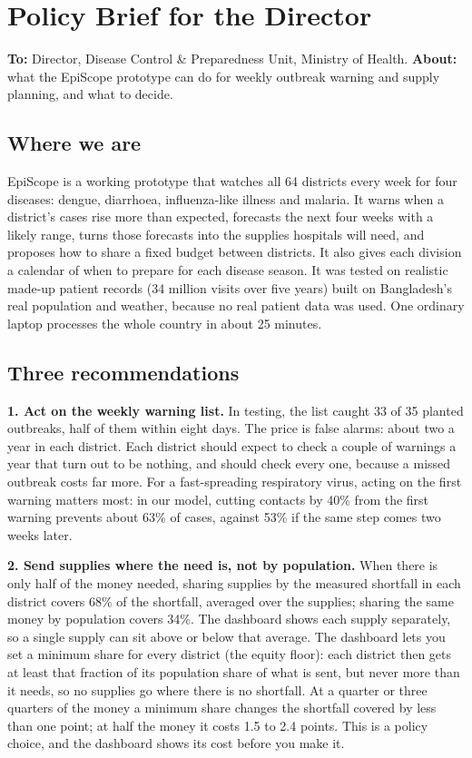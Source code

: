 \section{Policy Brief for the Director}
\textbf{To:} Director, Disease Control \& Preparedness Unit, Ministry of Health. \textbf{About:} what the EpiScope prototype
can do for weekly outbreak warning and supply planning, and what to decide.

\subsection*{Where we are}
EpiScope is a working prototype that watches all 64 districts every week for four diseases: dengue,
diarrhoea, influenza-like illness and malaria. It warns when a district's cases rise more than expected,
forecasts the next four weeks with a likely range, turns those forecasts into the supplies hospitals will need,
and proposes how to share a fixed budget between districts. It also gives each division a calendar of when to
prepare for each disease season. It was tested on realistic made-up patient records (34 million visits over
five years) built on Bangladesh's real population and weather, because no real patient data was used. One
ordinary laptop processes the whole country in about 25 minutes.

\subsection*{Three recommendations}
\textbf{1. Act on the weekly warning list.} In testing, the list caught 33 of 35 planted outbreaks, half of
them within eight days. The price is false alarms: about two a year in each district. Each district should
expect to check a couple of warnings a year that turn out to be nothing, and should check every one, because a
missed outbreak costs far more. For a fast-spreading respiratory virus, acting on the first warning matters
most: in our model, cutting contacts by 40\% from the first warning prevents about 63\% of cases, against 53\%
if the same step comes two weeks later.

\textbf{2. Send supplies where the need is, not by population.} When there is only half of the money needed,
sharing supplies by the measured shortfall in each district covers 68\% of the shortfall, averaged over the
supplies; sharing the same money by population covers 34\%. The dashboard shows each supply separately, so a
single supply can sit above or below that average. The dashboard lets you set a minimum share for every district (the equity
floor): each district then gets at least that fraction of its population share of what is sent, but never more
than it needs, so no supplies go where there is no shortfall. At a quarter or three quarters of the money a
minimum share changes the shortfall covered by less than one point; at half the money it costs 1.5 to 2.4 points. This is a policy choice, and the dashboard shows its cost before you make it.

